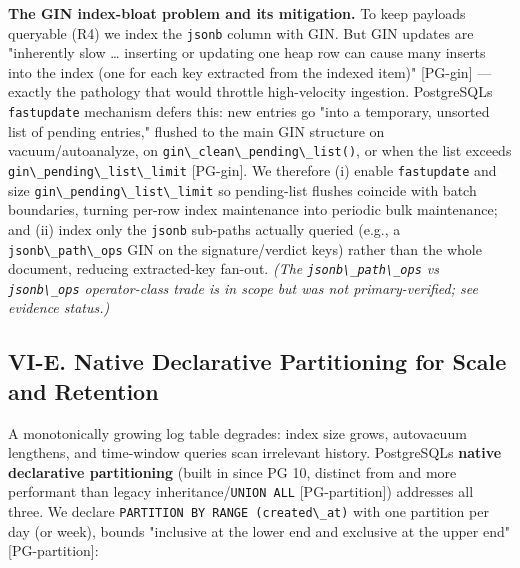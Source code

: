 \textbf{The GIN index-bloat problem and its mitigation.} To keep
payloads queryable (R4) we index the \passthrough{\lstinline!jsonb!}
column with GIN. But GIN updates are "inherently slow \ldots{} inserting
or updating one heap row can cause many inserts into the index (one for
each key extracted from the indexed item)" {[}PG-gin{]} --- exactly the
pathology that would throttle high-velocity ingestion.
PostgreSQL\textquotesingle s \passthrough{\lstinline!fastupdate!}
mechanism defers this: new entries go "into a temporary, unsorted list
of pending entries," flushed to the main GIN structure on
vacuum/autoanalyze, on
\passthrough{\lstinline!gin\_clean\_pending\_list()!}, or when the list
exceeds \passthrough{\lstinline!gin\_pending\_list\_limit!}
{[}PG-gin{]}. We therefore (i) enable
\passthrough{\lstinline!fastupdate!} and size
\passthrough{\lstinline!gin\_pending\_list\_limit!} so pending-list
flushes coincide with batch boundaries, turning per-row index
maintenance into periodic bulk maintenance; and (ii) index only the
\passthrough{\lstinline!jsonb!} sub-paths actually queried (e.g., a
\passthrough{\lstinline!jsonb\_path\_ops!} GIN on the signature/verdict
keys) rather than the whole document, reducing extracted-key fan-out.
\emph{(The \passthrough{\lstinline!jsonb\_path\_ops!} vs
\passthrough{\lstinline!jsonb\_ops!} operator-class trade is in scope
but was not primary-verified; see evidence status.)}

\subsection{VI-E. Native Declarative Partitioning for Scale and
Retention}\label{vi-e-native-declarative-partitioning-for-scale-and-retention}

A monotonically growing log table degrades: index size grows, autovacuum
lengthens, and time-window queries scan irrelevant history.
PostgreSQL\textquotesingle s \textbf{native declarative partitioning}
(built in since PG 10, distinct from and more performant than legacy
inheritance/\passthrough{\lstinline!UNION ALL!} {[}PG-partition{]})
addresses all three. We declare
\passthrough{\lstinline!PARTITION BY RANGE (created\_at)!} with one
partition per day (or week), bounds "inclusive at the lower end and
exclusive at the upper end" {[}PG-partition{]}:

